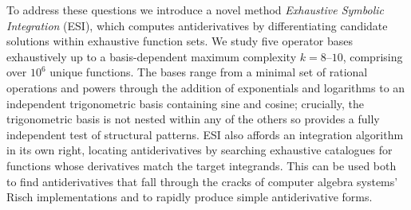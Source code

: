 \documentclass[preprint,12pt,authoryear]{elsarticle}
\newcommand{\rhok}{\rho(k)}
\newcommand{\dd}{{\rm d}}
\newcommand{\hd}[1]{{\color{red}\textbf{[HD: #1]}}}
\begin{document}
To address these questions we introduce a novel method \emph{Exhaustive Symbolic Integration} (ESI), which computes antiderivatives by differentiating candidate solutions within exhaustive function sets. We study five operator bases exhaustively up to a basis-dependent maximum complexity $k=8$--$10$, comprising
over $10^6$ unique functions.
The bases range
from a minimal set of rational operations and powers through the
addition of exponentials and logarithms to an
independent trigonometric basis containing sine and cosine; crucially, the trigonometric basis is not nested within any of the others so provides a fully independent test of structural patterns.
ESI also affords an integration algorithm in its own right, locating antiderivatives by searching exhaustive catalogues for functions whose derivatives match the target integrands. This can be used both to find antiderivatives that fall through the cracks of computer algebra systems' Risch implementations and to rapidly produce simple antiderivative forms.
\end{document}
